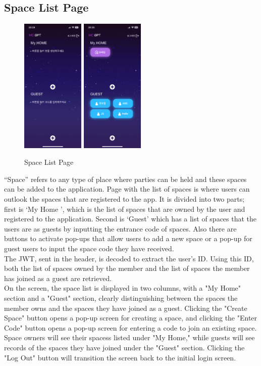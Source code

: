 \documentclass[conference]{IEEEtran}
\begin{document}
    \subsection{Space List Page}
        \begin{figure}[htbp]
            \centerline{
            \includegraphics[width=3cm]{Images/screen/space/1_SPACE_EMPTY.PNG}
            \includegraphics[width=3cm]{Images/screen/space/8_SPACE_FULL.PNG}}
            \caption{Space List Page}
            \label{fig}
        \end{figure}
        “Space” refers to any type of place where parties can be held and these spaces can be added to the application. Page with the list of spaces is where users can outlook the spaces that are registered to the app. It is divided into two parts; first is ‘My Home ', which is the list of spaces that are owned by the user and registered to the application. Second is ‘Guest’ which has a list of spaces that the users are as guests by inputting the entrance code of spaces. Also there are buttons to activate pop-ups that allow users to add a new space or a pop-up for guest users to input the space code they have received.\\
        The JWT, sent in the header, is decoded to extract the user's ID. Using this ID, both the list of spaces owned by the member and the list of spaces the member has joined as a guest are retrieved.\\
        On the screen, the space list is displayed in two columns, with a "My Home" section and a "Guest" section, clearly distinguishing between the spaces the member owns and the spaces they have joined as a guest.  Clicking the "Create Space" button opens a pop-up screen for creating a space, and clicking the "Enter Code" button opens a pop-up screen for entering a code to join an existing space. Space owners will see their spacess listed under "My Home," while guests will see records of the spaces they have joined under the "Guest" section.  Clicking the "Log Out" button will transition the screen back to the initial login screen.
\end{document}
